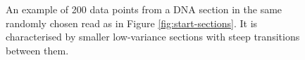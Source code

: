\begin{figure}
\centering

\caption{\label{fig:dna-section}An example of 200 data points from a DNA section in the same randomly chosen read as in Figure \ref{fig:start-sections}. It is characterised by smaller low-variance sections with steep transitions between them.}
\end{figure}
